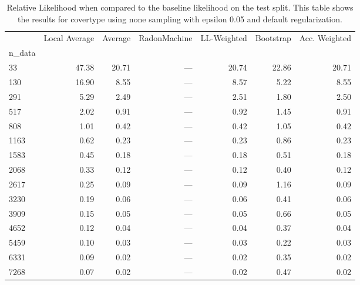 \begin{table}
\centering
\caption{Relative Likelihood when compared to the baseline likelihood on the test split. This table shows the results for  covertype using  none sampling with epsilon  0.05 and  default regularization.}
\label{tab:3}
\begin{tabular}{lrrrrrr}
\toprule
{} &  Local Average &  Average &  RadonMachine &  LL-Weighted &  Bootstrap &  Acc. Weighted \\
n\_data &                &          &               &              &            &                \\
\midrule
33     &          47.38 &    20.71 &           --- &        20.74 &      22.86 &          20.71 \\
130    &          16.90 &     8.55 &           --- &         8.57 &       5.22 &           8.55 \\
291    &           5.29 &     2.49 &           --- &         2.51 &       1.80 &           2.50 \\
517    &           2.02 &     0.91 &           --- &         0.92 &       1.45 &           0.91 \\
808    &           1.01 &     0.42 &           --- &         0.42 &       1.05 &           0.42 \\
1163   &           0.62 &     0.23 &           --- &         0.23 &       0.86 &           0.23 \\
1583   &           0.45 &     0.18 &           --- &         0.18 &       0.51 &           0.18 \\
2068   &           0.33 &     0.12 &           --- &         0.12 &       0.40 &           0.12 \\
2617   &           0.25 &     0.09 &           --- &         0.09 &       1.16 &           0.09 \\
3230   &           0.19 &     0.06 &           --- &         0.06 &       0.41 &           0.06 \\
3909   &           0.15 &     0.05 &           --- &         0.05 &       0.66 &           0.05 \\
4652   &           0.12 &     0.04 &           --- &         0.04 &       0.37 &           0.04 \\
5459   &           0.10 &     0.03 &           --- &         0.03 &       0.22 &           0.03 \\
6331   &           0.09 &     0.02 &           --- &         0.02 &       0.35 &           0.02 \\
7268   &           0.07 &     0.02 &           --- &         0.02 &       0.47 &           0.02 \\
\bottomrule
\end{tabular}
\end{table}
